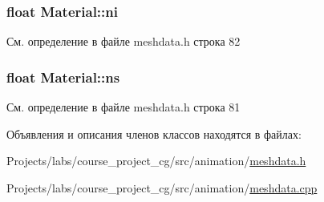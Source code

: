 \subsubsection[{\texorpdfstring{ni}{ni}}]{\setlength{\rightskip}{0pt plus 5cm}float Material\+::ni\hspace{0.3cm}{\ttfamily [private]}}\hypertarget{class_material_a9132d1f6cc468abe6c40659962e06236}{}\label{class_material_a9132d1f6cc468abe6c40659962e06236}


См. определение в файле meshdata.\+h строка 82

\subsubsection[{\texorpdfstring{ns}{ns}}]{\setlength{\rightskip}{0pt plus 5cm}float Material\+::ns\hspace{0.3cm}{\ttfamily [private]}}\hypertarget{class_material_a49335919c5596c4523f71be7f01bdf9d}{}\label{class_material_a49335919c5596c4523f71be7f01bdf9d}


См. определение в файле meshdata.\+h строка 81



Объявления и описания членов классов находятся в файлах\+:\begin{DoxyCompactItemize}
\item 
Projects/labs/course\+\_\+project\+\_\+cg/src/animation/\hyperlink{meshdata_8h}{meshdata.\+h}\item 
Projects/labs/course\+\_\+project\+\_\+cg/src/animation/\hyperlink{meshdata_8cpp}{meshdata.\+cpp}\end{DoxyCompactItemize}
